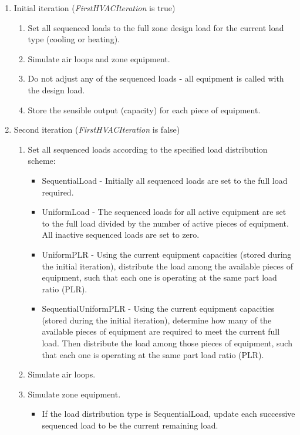\begin{enumerate}
\item
  Initial iteration (\emph{FirstHVACIteration} is true)
  \begin{enumerate}
  \item
    Set all sequenced loads to the full zone design load for the current load type (cooling or heating).
  \item
    Simulate air loops and zone equipment.
  \item
    Do not adjust any of the sequenced loads - all equipment is called with the design load.
  \item
    Store the sensible output (capacity) for each piece of equipment.
  \end{enumerate}
\item
  Second iteration (\emph{FirstHVACIteration} is false)
  \begin{enumerate}
  \item
    Set all sequenced loads according to the specified load distribution scheme:
    \begin{itemize}
    \item
      SequentialLoad - Initially all sequenced loads are set to the full load required.
    \item
      UniformLoad - The sequenced loads for all active equipment are set to the full load divided by the number of active pieces of equipment. All inactive sequenced loads are set to zero.
    \item
      UniformPLR - Using the current equipment capacities (stored during the initial iteration), distribute the load among the available pieces of equipment, such that each one is operating at the same part load ratio (PLR).
    \item
      SequentialUniformPLR - Using the current equipment capacities (stored during the initial iteration), determine how many of the available pieces of equipment are required to meet the current full load.  Then distribute the load among those pieces of equipment, such that each one is operating at the same part load ratio (PLR).
    \end{itemize}
  \item
    Simulate air loops.
  \item
    Simulate zone equipment.
    \begin{itemize}
    \item
      If the load distribution type is SequentialLoad, update each successive sequenced load to be the current remaining load. 

\end{itemize}
\end{enumerate}
\end{enumerate}

